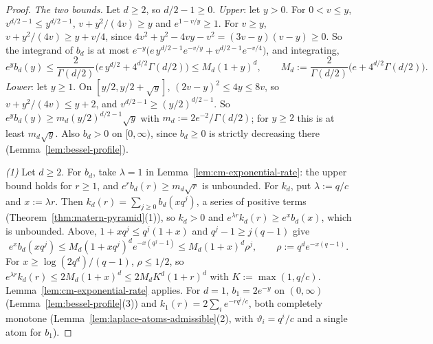 \begin{proof}
\emph{The two bounds.} Let $d \ge 2$, so $d/2 - 1 \ge 0$. \emph{Upper}: let $y > 0$. For
$0 < v \le y$, $v^{d/2-1} \le y^{d/2-1}$, $v + y^2/(4v) \ge y$ and $e^{1 - v/y} \ge 1$. For $v \ge y$,
$v + y^2/(4v) \ge y + v/4$, since $4v^2 + y^2 - 4vy - v^2 = (3v - y)(v - y) \ge 0$. So the integrand
of $b_d$ is at most $e^{-y}\bigl(e\,y^{d/2-1}e^{-v/y} + v^{d/2-1}e^{-v/4}\bigr)$, and integrating,
\[
  e^yb_d(y) \le \frac{2}{\Gamma(d/2)}\bigl(e\,y^{d/2} + 4^{d/2}\Gamma(d/2)\bigr)
  \le M_d(1 + y)^d , \qquad M_d := \frac{2}{\Gamma(d/2)}\bigl(e + 4^{d/2}\Gamma(d/2)\bigr) .
\]
\emph{Lower}: let $y \ge 1$. On $[y/2, y/2 + \sqrt y]$, $(2v - y)^2 \le 4y \le 8v$, so
$v + y^2/(4v) \le y + 2$, and $v^{d/2-1} \ge (y/2)^{d/2-1}$. So
$e^yb_d(y) \ge m_d(y/2)^{d/2-1}\sqrt y$ with $m_d := 2e^{-2}/\Gamma(d/2)$; for $y \ge 2$ this is at
least $m_d\sqrt y$. Also $b_d > 0$ on $[0, \infty)$, since $b_d \ge 0$ is strictly decreasing there
(Lemma~\ref{lem:bessel-profile}).

\emph{(1)} Let $d \ge 2$. For $b_d$, take $\lambda = 1$ in Lemma~\ref{lem:cm-exponential-rate}: the
upper bound holds for $r \ge 1$, and $e^rb_d(r) \ge m_d\sqrt r$ is unbounded. For $k_d$, put
$\lambda := q/c$ and $x := \lambda r$. Then $k_d(r) = \sum_{j \ge 0}b_d(xq^j)$, a series of positive
terms (Theorem~\ref{thm:matern-pyramid}(1)), so $k_d > 0$ and $e^{\lambda r}k_d(r) \ge e^xb_d(x)$,
which is unbounded. Above, $1 + xq^j \le q^j(1 + x)$ and $q^j - 1 \ge j(q - 1)$ give
\[
  e^xb_d(xq^j) \le M_d(1 + xq^j)^de^{-x(q^j - 1)} \le M_d(1 + x)^d\rho^j ,
  \qquad \rho := q^de^{-x(q - 1)} .
\]
For $x \ge \log(2q^d)/(q - 1)$, $\rho \le 1/2$, so $e^{\lambda r}k_d(r) \le 2M_d(1 + x)^d \le
2M_dK^d(1 + r)^d$ with $K := \max(1, q/c)$. Lemma~\ref{lem:cm-exponential-rate} applies. For $d = 1$,
$b_1 = 2e^{-y}$ on $(0, \infty)$ (Lemma~\ref{lem:bessel-profile}(3)) and
$k_1(r) = 2\sum_ie^{-rq^i/c}$, both completely monotone (Lemma~\ref{lem:laplace-atoms-admissible}(2),
with $\vartheta_i = q^i/c$ and a single atom for $b_1$).


\end{proof}

